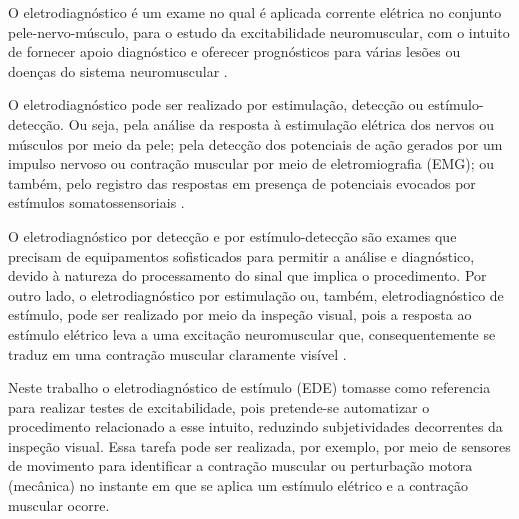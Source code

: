 O eletrodiagnóstico é um exame no qual é aplicada corrente elétrica no conjunto pele-nervo-músculo, para o estudo da excitabilidade neuromuscular, com o intuito de fornecer apoio diagnóstico e oferecer prognósticos para várias lesões ou doenças do sistema neuromuscular \cite{Tejada1997ElectrodiagnosticoEstimulacion}.

O eletrodiagnóstico pode ser realizado por estimulação, detecção ou estímulo-detecção. Ou seja, pela análise da resposta à estimulação elétrica dos nervos ou músculos por meio da pele; pela detecção dos potenciais de ação gerados por um impulso nervoso ou contração muscular por meio de eletromiografia (\acrshort{EMG}); ou também, pelo registro das respostas em presença de potenciais evocados por estímulos somatossensoriais \cite{Fernandes2016StimulusRecovery, Paternostro-Sulga2002ChronaxieDenervation, Kimura2013ElectrodiagnosisMuscle}. 

O eletrodiagnóstico por detecção e por estímulo-detecção são exames que precisam de equipamentos sofisticados para permitir a análise e diagnóstico, devido à natureza do processamento do sinal que implica o procedimento. Por outro lado, o eletrodiagnóstico por estimulação ou, também, eletrodiagnóstico de estímulo, pode ser realizado por meio da inspeção visual, pois a resposta ao estímulo elétrico leva a uma excitação neuromuscular que, consequentemente se traduz em uma contração muscular claramente visível \cite{Naki2011IsParameters, Fernandes2016StimulusRecovery}. 

Neste trabalho o eletrodiagnóstico de estímulo (\acrshort{EDE}) tomasse como referencia para realizar testes de excitabilidade, pois pretende-se automatizar o procedimento relacionado a esse intuito, reduzindo subjetividades decorrentes da inspeção visual. Essa tarefa pode ser realizada, por exemplo, por meio de sensores de movimento para identificar a contração muscular ou perturbação motora (mecânica) no instante em que se aplica um estímulo elétrico e a contração muscular ocorre.


